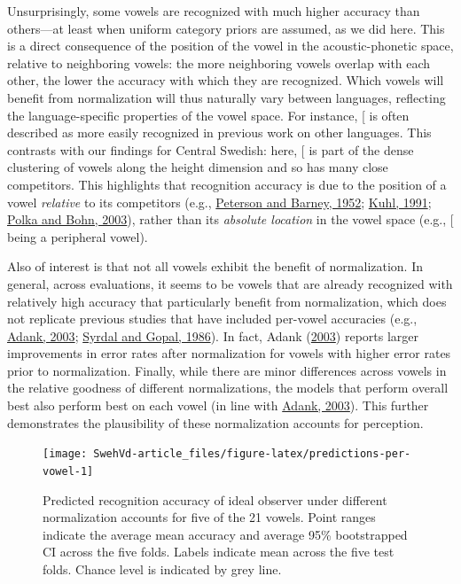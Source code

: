 \documentclass[utf8]{frontiersSCNS}
\begin{document}
Unsurprisingly, some vowels are recognized with much higher accuracy than others---at least when uniform category priors are assumed, as we did here. This is a direct consequence of the position of the vowel in the acoustic-phonetic space, relative to neighboring vowels: the more neighboring vowels overlap with each other, the lower the accuracy with which they are recognized. Which vowels will benefit from normalization will thus naturally vary between languages, reflecting the language-specific properties of the vowel space. For instance, {[}\ipatext{iː}{]} is often described as more easily recognized in previous work on other languages. This contrasts with our findings for Central Swedish: here, {[}\ipatext{iː}{]} is part of the dense clustering of vowels along the height dimension and so has many close competitors. This highlights that recognition accuracy is due to the position of a vowel \emph{relative} to its competitors (e.g., \protect\hyperlink{ref-Peterson1952}{Peterson and Barney, 1952}; \protect\hyperlink{ref-Kuhl1991}{Kuhl, 1991}; \protect\hyperlink{ref-Polka2003}{Polka and Bohn, 2003}), rather than its \emph{absolute location} in the vowel space (e.g., {[}\ipatext{iː}{]} being a peripheral vowel).

Also of interest is that not all vowels exhibit the benefit of normalization. In general, across evaluations, it seems to be vowels that are already recognized with relatively high accuracy that particularly benefit from normalization, which does not replicate previous studies that have included per-vowel accuracies (e.g., \protect\hyperlink{ref-adank2003}{Adank, 2003}; \protect\hyperlink{ref-Syrdal1986}{Syrdal and Gopal, 1986}). In fact, Adank (\protect\hyperlink{ref-adank2003}{2003}) reports larger improvements in error rates after normalization for vowels with higher error rates prior to normalization. Finally, while there are minor differences across vowels in the relative goodness of different normalizations, the models that perform overall best also perform best on each vowel (in line with \protect\hyperlink{ref-adank2003}{Adank, 2003}). This further demonstrates the plausibility of these normalization accounts for perception.



\begin{landscape}

\begin{figure}

{\centering \texttt{[image: SwehVd-article\_files/figure-latex/predictions-per-vowel-1]} 

}

\caption{Predicted recognition accuracy of ideal observer under different normalization accounts for five of the 21 vowels. Point ranges indicate the average mean accuracy and average 95\% bootstrapped CI across the five folds. Labels indicate mean across the five test folds. Chance level is indicated by grey line.}\label{fig:predictions-per-vowel}
\end{figure}

\end{landscape}
\end{document}

